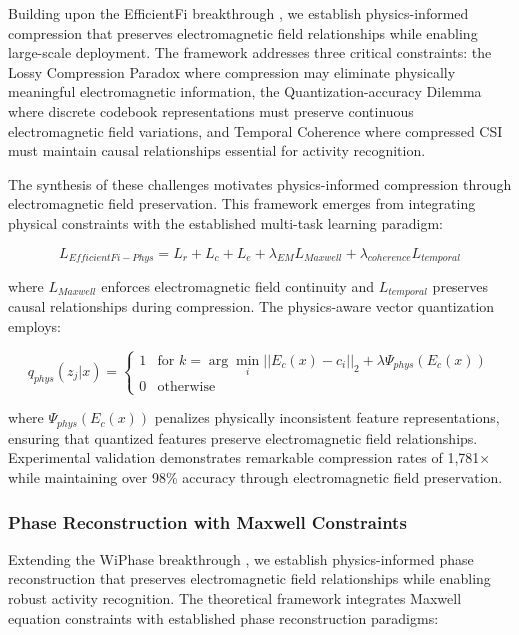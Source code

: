\documentclass[journal]{IEEEtran}
\begin{document}
Building upon the EfficientFi breakthrough \cite{chen2024efficientfi}, we establish physics-informed compression that preserves electromagnetic field relationships while enabling large-scale deployment. The framework addresses three critical constraints: the Lossy Compression Paradox where compression may eliminate physically meaningful electromagnetic information, the Quantization-accuracy Dilemma where discrete codebook representations must preserve continuous electromagnetic field variations, and Temporal Coherence where compressed CSI must maintain causal relationships essential for activity recognition.

The synthesis of these challenges motivates physics-informed compression through electromagnetic field preservation. This framework emerges from integrating physical constraints with the established multi-task learning paradigm:

\begin{equation}
L_{EfficientFi-Phys} = L_r + L_c + L_e + \lambda_{EM} L_{Maxwell} + \lambda_{coherence} L_{temporal}
\label{eq:efficientfi_physics_loss}
\end{equation}

where $L_{Maxwell}$ enforces electromagnetic field continuity and $L_{temporal}$ preserves causal relationships during compression. The physics-aware vector quantization employs:

\begin{equation}
q_{phys}(z_j|x) = \begin{cases}
1 & \text{for } k = \arg\min_i ||E_c(x) - c_i||_2 + \lambda \Psi_{phys}(E_c(x)) \\
0 & \text{otherwise}
\end{cases}
\label{eq:quantization_physics}
\end{equation}

where $\Psi_{phys}(E_c(x))$ penalizes physically inconsistent feature representations, ensuring that quantized features preserve electromagnetic field relationships. Experimental validation demonstrates remarkable compression rates of 1,781× while maintaining over 98\% accuracy through electromagnetic field preservation.

\subsubsection{Phase Reconstruction with Maxwell Constraints}

Extending the WiPhase breakthrough \cite{chen2024wiphase}, we establish physics-informed phase reconstruction that preserves electromagnetic field relationships while enabling robust activity recognition. The theoretical framework integrates Maxwell equation constraints with established phase reconstruction paradigms:
\end{document}
